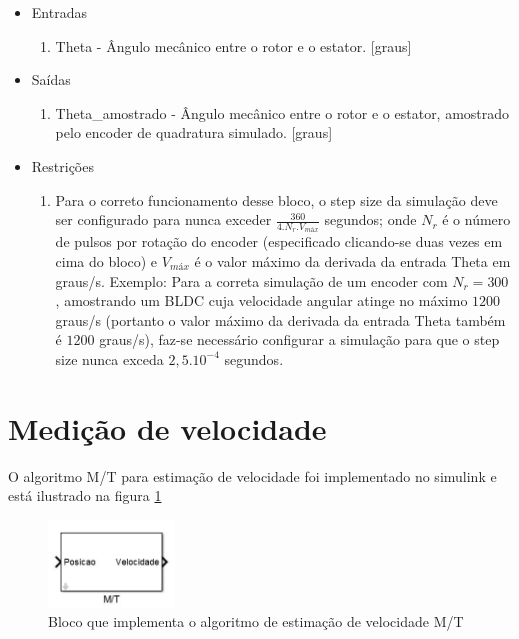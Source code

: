         \begin{itemize}
            \item Entradas
                \begin{enumerate}
                    \item Theta - Ângulo mecânico entre o rotor e o estator. [graus]
                \end{enumerate}
            \item Saídas
                \begin{enumerate}
                    \item Theta\_amostrado - Ângulo mecânico entre o rotor e o estator, amostrado pelo encoder de quadratura simulado. [graus]
                \end{enumerate}
            \item Restrições
                \begin{enumerate}
                    \item Para o correto funcionamento desse bloco, o step size da simulação deve ser configurado para nunca exceder $\frac{360}{4.N_r.V_{máx}}$ segundos; onde $N_r$ é o número de pulsos por rotação do encoder (especificado clicando-se duas vezes em cima do bloco) e $V_{máx}$ é o valor máximo da derivada da entrada Theta em graus/s. Exemplo: Para a correta simulação de um encoder com $N_r=300$, amostrando um BLDC cuja velocidade angular atinge no máximo $1200$ graus/s (portanto o valor máximo da derivada da entrada Theta também é $1200$ graus/s), faz-se necessário configurar a simulação para que o step size nunca exceda $2,5 . 10^{-4}$ segundos.
                \end{enumerate}
        \end{itemize}


    \newpage
    \section{Medição de velocidade}
        O algoritmo M/T para estimação de velocidade \cite{algoritmoMT} foi implementado no simulink e está ilustrado na figura \ref{fig:bloco_MT}
        \begin{figure}[ht]
            \centering
            \includegraphics[width=0.3\textwidth]{bloco_MT}
            \caption{Bloco que implementa o algoritmo de estimação de velocidade M/T}
            \label{fig:bloco_MT}
        \end{figure}

